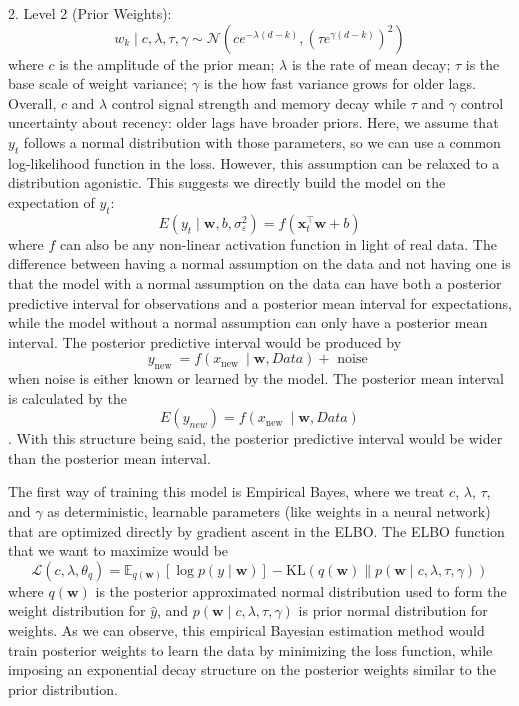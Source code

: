 \documentclass{article}
\begin{document}
2. Level 2 (Prior Weights):
$$w_k \mid c, \lambda, \tau, \gamma \sim \mathcal{N}\left(c e^{-\lambda(d-k)},\left(\tau e^{\gamma(d-k)}\right)^2\right)$$
where $c$ is the amplitude of the prior mean; $\lambda$ is the rate of mean decay; $\tau$ is the base scale of weight variance; $\gamma$ is the how fast variance grows for older lags. Overall, $c$ and $\lambda$ control signal strength and memory decay while $\tau$ and $\gamma$ control uncertainty about recency: older lags have broader priors. Here, we assume that $y_t$ follows a normal distribution with those parameters, so we can use a common log-likelihood function in the loss. However, this assumption can be relaxed to a distribution agonistic. This suggests we directly build the model on the expectation of $y_t$: $$E(y_t\mid \mathbf{w}, b, \sigma_{\varepsilon}^2)=f\left(\mathbf{x}_t^{\top} \mathbf{w}+b\right)$$ where $f$ can also be any non-linear activation function in light of real data. The difference between having a normal assumption on the data and not having one is that the model with a normal assumption on the data can have both a posterior predictive interval for observations and a posterior mean interval for expectations, while the model without a normal assumption can only have a posterior mean interval. The posterior predictive interval would be produced by $$y_{\text {new }}=f\left(x_{\text {new }}\mid \mathbf{w}, Data\right)+\text { noise }$$ when noise is either known or learned by the model. The posterior mean interval is calculated by the $$E(y_{new})=f\left(x_{\text {new }}\mid \mathbf{w}, Data\right)$$. With this structure being said, the posterior predictive interval would be wider than the posterior mean interval.

The first way of training this model is Empirical Bayes, where we treat $c$, $\lambda$, $\tau$, and $\gamma$ as deterministic, learnable parameters (like weights in a neural network) that are optimized directly by gradient ascent in the ELBO. The ELBO function that we want to maximize would be 
$$\mathcal{L}\left(c, \lambda, \theta_q\right)=\mathbb{E}_{q(\mathbf{w})}[\log p(y \mid \mathbf{w})]-\mathrm{KL}(q(\mathbf{w}) \| p(\mathbf{w} \mid c, \lambda, \tau, \gamma))$$ where $q(\mathbf{w})$ is the posterior approximated normal distribution used to form the weight distribution for $\hat{y}$, and $p(\mathbf{w} \mid c, \lambda, \tau, \gamma)$ is prior normal distribution for weights. As we can observe, this empirical Bayesian estimation method would train posterior weights to learn the data by minimizing the loss function, while imposing an exponential decay structure on the posterior weights similar to the prior distribution.
\end{document}

